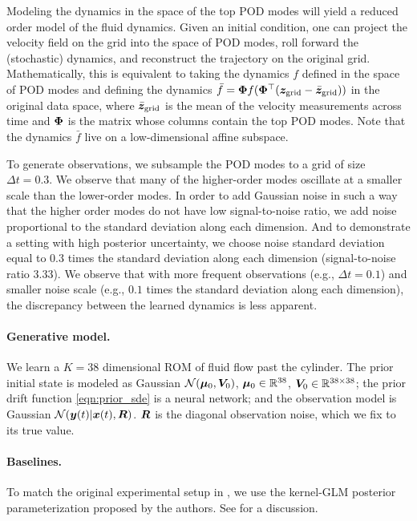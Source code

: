 Modeling the dynamics in the space of the top POD modes will yield a reduced order model of the fluid dynamics. 
Given an initial condition, one can project the velocity field on the grid into the space of POD modes, roll forward the (stochastic) dynamics, and reconstruct the trajectory on the original grid. 
Mathematically, this is equivalent to taking the dynamics $f$ defined in the space of POD modes and defining the dynamics $\bar{f} = \boldsymbol{\Phi} f(\boldsymbol{\Phi}^\top (\boldsymbol{z}_{\mathrm{grid}} - \bar{\boldsymbol{z}}_{\mathrm{grid}}))$ in the original data space, where $\bar{\boldsymbol{z}}_{\mathrm{grid}}$ is the mean of the velocity measurements across time and $\boldsymbol{\Phi}$ is the matrix whose columns contain the top POD modes.
Note that the dynamics $\bar{f}$ live on a low-dimensional affine subspace.

To generate observations, we subsample the POD modes to a grid of size $\Delta t = 0.3$.
We observe that many of the higher-order modes oscillate at a smaller scale than the lower-order modes. 
In order to add Gaussian noise in such a way that the higher order modes do not have low signal-to-noise ratio, we add noise proportional to the standard deviation along each dimension. 
And to demonstrate a setting with high posterior uncertainty, we choose noise standard deviation equal to $0.3$ times the standard deviation along each dimension (signal-to-noise ratio $3.33$).
We observe that with more frequent observations (e.g., $\Delta t = 0.1$) and smaller noise scale (e.g., $0.1$ times the standard deviation along each dimension), the discrepancy between the learned dynamics is less apparent. 

\paragraph{Generative model.}
We learn a $K = 38$ dimensional ROM of fluid flow past the cylinder.
The prior initial state is modeled as Gaussian $\mathcal{N}(\boldsymbol{\mu}_0, \boldsymbol{V}_0)$, $\boldsymbol{\mu}_0 \in \mathbb{R}^{38}$, $\boldsymbol{V}_0 \in \mathbb{R}^{38 \times 38}$; the prior drift function \cref{eqn:prior_sde} is a neural network; and the observation model is Gaussian $\mathcal{N}(\boldsymbol{y}(t) | \boldsymbol{x}(t), \boldsymbol{R})$.
$\boldsymbol{R}$ is the diagonal observation noise, which we fix to its true value.

\paragraph{Baselines.}
To match the original experimental setup in \citet{course2023state}, we use the kernel-GLM posterior parameterization proposed by the authors. 
See  for a discussion.

